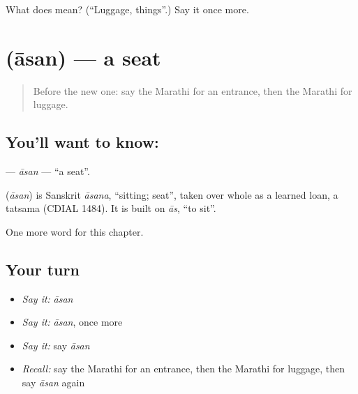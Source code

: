 \begin{tcolorbox}[breakable,colback=teal!4,colframe=teal!35!black,title={Before you move on}]
What does  mean? (\textquotedblleft{}Luggage, things\textquotedblright{}.) Say it once more.
\end{tcolorbox}
\section[\texorpdfstring{\mr{आसन} (āsan)}{आसन (āsan)}]{ (āsan) — a seat}

\label{lesson:MR-C240-asan}



\begin{quote}
Before the new one: say the Marathi for an entrance, then the Marathi for luggage.
\end{quote}

\subsection*{You'll want to know: }
\textbf{} — \emph{āsan} — \textquotedblleft{}a seat\textquotedblright{}.

\begin{cousinweb}
\textbf{} (\emph{āsan}) is Sanskrit \emph{āsana}, \textquotedblleft{}sitting; seat\textquotedblright{}, taken over whole as a learned loan, a tatsama (CDIAL 1484). It is built on \emph{ās}, \textquotedblleft{}to sit\textquotedblright{}.
\end{cousinweb}

\begin{grammarlens}[title={What you've built}]
One more word for this chapter.
\end{grammarlens}

\subsection*{Your turn}
\begin{itemize}
\raggedright
  \item \emph{Say it:} \emph{āsan}
  \item \emph{Say it:} \emph{āsan}, once more
  \item \emph{Say it:} say \emph{āsan}
  \item \emph{Recall:} say the Marathi for an entrance, then the Marathi for luggage, then say \emph{āsan} again
\end{itemize}

